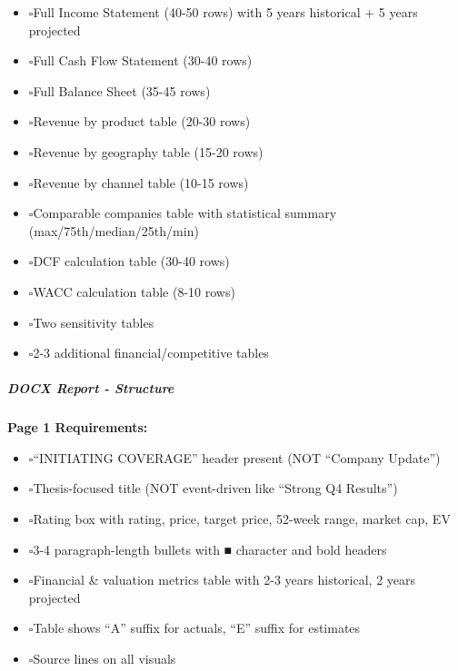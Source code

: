\documentclass[11pt]{article}
\newcommand{\UncheckedBox}{$\square$}
\begin{document}
\begin{itemize}[leftmargin=*,itemsep=2pt,topsep=2pt]
\item {} \UncheckedBox Full Income Statement (40-50 rows) with 5 years historical + 5 years projected
\item {} \UncheckedBox Full Cash Flow Statement (30-40 rows)
\item {} \UncheckedBox Full Balance Sheet (35-45 rows)
\item {} \UncheckedBox Revenue by product table (20-30 rows)
\item {} \UncheckedBox Revenue by geography table (15-20 rows)
\item {} \UncheckedBox Revenue by channel table (10-15 rows)
\item {} \UncheckedBox Comparable companies table with statistical summary (max/75th/median/25th/min)
\item {} \UncheckedBox DCF calculation table (30-40 rows)
\item {} \UncheckedBox WACC calculation table (8-10 rows)
\item {} \UncheckedBox Two sensitivity tables
\item {} \UncheckedBox 2-3 additional financial/competitive tables
\end{itemize}

\subparagraph{DOCX Report - Structure}\mbox{}\par

\textbf{Page 1 Requirements:}

\begin{itemize}[leftmargin=*,itemsep=2pt,topsep=2pt]
\item {} \UncheckedBox ``INITIATING COVERAGE'' header present (NOT ``Company Update'')
\item {} \UncheckedBox Thesis-focused title (NOT event-driven like ``Strong Q4 Results'')
\item {} \UncheckedBox Rating box with rating, price, target price, 52-week range, market cap, EV
\item {} \UncheckedBox 3-4 paragraph-length bullets with ■ character and bold headers
\item {} \UncheckedBox Financial \& valuation metrics table with 2-3 years historical, 2 years projected
\item {} \UncheckedBox Table shows ``A'' suffix for actuals, ``E'' suffix for estimates
\item {} \UncheckedBox Source lines on all visuals
\end{itemize}
\end{document}
